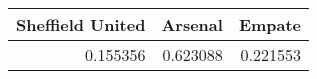 \begin{tabular}{rrr}
\hline
   Sheffield United &   Arsenal &   Empate \\
\hline
           0.155356 &  0.623088 & 0.221553 \\
\hline
\end{tabular}
